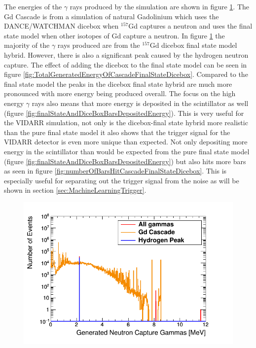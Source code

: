 The energies of the $\gamma$ rays produced by the simulation are shown in figure \ref{fig:gdCascadeVsAllGammas}. The Gd Cascade is from a simulation of natural Gadolinium which uses the DANCE/WATCHMAN dicebox when $^{157}$Gd captures a neutron and uses the final state model when other isotopes of Gd capture a neutron. In figure \ref{fig:gdCascadeVsAllGammas} the majority of the $\gamma$ rays produced are from the $^{157}$Gd dicebox final state model hybrid. However, there is also a significant peak caused by the hydrogen neutron capture. The effect of adding the dicebox to the final state model can be seen in figure \ref{fig:TotalGeneratedEnergyOfCascadeFinalStateDicebox}. Compared to the final state model the peaks in the dicebox final state hybrid are much more pronounced with more energy being produced overall. The focus on the high energy $\gamma$ rays also means that more energy is deposited in the scintillator as well (figure \ref{fig:finalStateAndDiceBoxBarsDepositedEnergy}). This is very useful for the VIDARR simulation, not only is the dicebox-final state hybrid more realistic than the pure final state model it also shows that the trigger signal for the VIDARR detector is even more unique than expected. Not only depositing more energy in the scintillator than would be expected from the pure final state model (figure \ref{fig:finalStateAndDiceBoxBarsDepositedEnergy}) but also hits more bars as seen in figure \ref{fig:numberOfBarsHitCascadeFinalStateDicebox}. This is especially useful for separating out the trigger signal from the noise as will be shown in section \ref{sec:MachineLearningTrigger}.

\begin{figure}[!h]
 \centering
 \includegraphics[width=0.7\linewidth]{Chapter4/Figs/Raster/gadolinium/gdCascadeVsAllGammas.png}
 \label{fig:gdCascadeVsAllGammas}
\end{figure}

